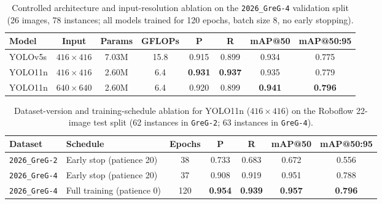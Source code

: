 
\begin{table}[t]
  \centering
  \caption{Controlled architecture and input-resolution ablation on the \texttt{2026\_GreG-4} validation split (26 images, 78 instances; all models trained for 120 epochs, batch size 8, no early stopping).}
  \label{tab:greg4-val-ablation}
  \begin{tabular}{lccccccc}
    \toprule
    Model & Input & Params & GFLOPs & P & R & mAP@50 & mAP@50:95 \\
    \midrule
    YOLOv5s & $416\times416$ & 7.03M & 15.8 & 0.915 & 0.899 & 0.934 & 0.775 \\
    YOLO11n & $416\times416$ & 2.60M & 6.4  & \textbf{0.931} & \textbf{0.937} & 0.935 & 0.779 \\
    YOLO11n & $640\times640$ & 2.60M & 6.4  & 0.920 & 0.899 & \textbf{0.941} & \textbf{0.796} \\
    \bottomrule
  \end{tabular}
\end{table}

\begin{table}[t]
  \centering
  \caption{Dataset-version and training-schedule ablation for YOLO11n ($416\times416$) on the Roboflow 22-image test split (62 instances in \texttt{GreG-2}; 63 instances in \texttt{GreG-4}).}
  \label{tab:greg-test-ablation}
  \begin{tabular}{llccccc}
    \toprule
    Dataset & Schedule & Epochs & P & R & mAP@50 & mAP@50:95 \\
    \midrule
    \texttt{2026\_GreG-2} & Early stop (patience 20) & 38  & 0.733 & 0.683 & 0.672 & 0.556 \\
    \texttt{2026\_GreG-4} & Early stop (patience 20) & 37  & 0.908 & 0.919 & 0.951 & 0.788 \\
    \texttt{2026\_GreG-4} & Full training (patience 0) & 120 & \textbf{0.954} & \textbf{0.939} & \textbf{0.957} & \textbf{0.796} \\
    \bottomrule
  \end{tabular}
\end{table}
